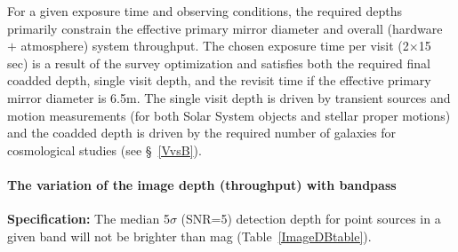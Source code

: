 For a given exposure time and observing conditions, the required depths
primarily constrain the effective primary mirror diameter and overall
(hardware $+$ atmosphere) system throughput. The chosen exposure time per visit
(2$\times$15 sec) is a result of the survey optimization and satisfies
both the required final coadded depth, single visit depth, and the revisit
time if the effective primary mirror diameter is 6.5m.
The single visit depth is driven by transient sources and motion measurements
(for both Solar System objects and stellar proper motions) and the coadded
depth is driven by the required number of galaxies for cosmological studies
(see \S~\ref{VvsB}).



\paragraph{The variation of the image depth (throughput) with bandpass\\}

{\bf Specification:} The median 5$\sigma$ (SNR=5) detection
depth for point sources in a given band will not be brighter than
mag (Table~\ref{ImageDBtable}).


